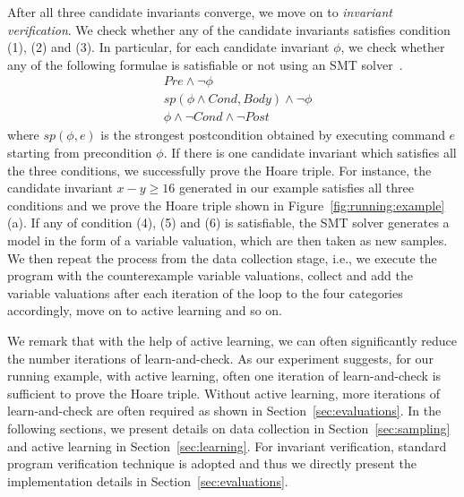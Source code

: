 After all three candidate invariants converge, we move on to \emph{invariant verification}. We check whether any of the candidate invariants satisfies condition (1), (2) and (3). In particular, for each candidate invariant $\phi$, we check whether any of the following formulae is satisfiable or not using an SMT solver~\cite{z3}.
\begin{align}
    & \mathit{Pre} \land \neg \phi \label{check:inv:pre} \\
     & sp(\phi \land \mathit{Cond}, \mathit{Body}) \land \neg \phi \label{check:inv:loop} \\
    & \phi \land \neg \mathit{Cond} \land \neg \mathit{Post} \label{check:inv:post}
\end{align}
where $sp(\phi,e)$ is the strongest postcondition obtained by executing command $e$
starting from precondition $\phi$.
If there is one candidate invariant which satisfies all the three conditions, we successfully prove the Hoare triple. For instance, the candidate invariant $x - y \geq 16$ generated in our example satisfies all three conditions and we prove the Hoare triple shown in Figure~\ref{fig:running:example}(a). If any of condition (4), (5) and (6) is satisfiable, the SMT solver generates a model in the form of a variable valuation, which are then taken as new samples. We then repeat the process from the data collection stage, i.e., we execute the program with the counterexample variable valuations, collect and add the variable valuations after each iteration of the loop to the four categories accordingly, move on to active learning and so on. 

We remark that with the help of active learning, we can often significantly reduce the number iterations of learn-and-check. As our experiment suggests, for our running example, with active learning, often one iteration of learn-and-check is sufficient to prove the Hoare triple. Without active learning, more iterations of learn-and-check are often required as shown in Section~\ref{sec:evaluations}. In the following sections, we present details on data collection in Section~\ref{sec:sampling} and active learning in Section~\ref{sec:learning}. For invariant verification, standard program verification technique is adopted and thus we directly present the implementation details in Section~\ref{sec:evaluations}.


